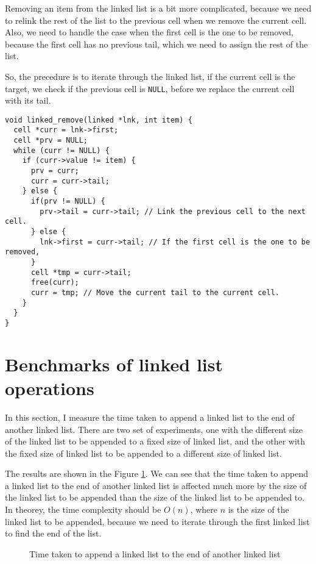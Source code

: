 \documentclass[a4paper,11pt]{article}
\begin{document}
Removing an item from the linked list is a bit more complicated, because we need to
relink the rest of the list to the previous cell when we remove the current cell.
Also, we need to handle the case when the first cell is the one to be removed, because
the first cell has no previous tail, which we need to assign the rest of the list.

So, the precedure is to iterate through the linked list, if the current cell is the target,
we check if the previous cell is {\tt NULL}, before we replace the current cell with its tail.

\begin{verbatim}
void linked_remove(linked *lnk, int item) {
  cell *curr = lnk->first;
  cell *prv = NULL;
  while (curr != NULL) {
    if (curr->value != item) {
      prv = curr;
      curr = curr->tail;
    } else {
      if(prv != NULL) {
        prv->tail = curr->tail; // Link the previous cell to the next cell.
      } else {
        lnk->first = curr->tail; // If the first cell is the one to be removed,
      }
      cell *tmp = curr->tail;
      free(curr);
      curr = tmp; // Move the current tail to the current cell.
    }
  }
}
\end{verbatim}

\section*{Benchmarks of linked list operations}

In this section, I measure the time taken to append a linked list to the end of another linked list.
There are two set of experiments, one with the different size of the linked list to be appended to a fixed size 
of linked list, and the other with the fixed size of linked list to be appended to a different size of linked list.

The results are shown in the Figure \ref{fig:append}. We can see that the time taken to append a linked list to the end of another linked list
is affected much more by the size of the linked list to be appended than the size of the linked list to be appended to.
In theorey, the time complexity should be $O(n)$, where $n$ is the size of the linked list to be appended, because
we need to iterate through the first linked list to find the end of the list.

\begin{figure}[H]
  \centering
  \caption{Time taken to append a linked list to the end of another linked list}
  \label{fig:append}
\end{figure}
\end{document}

